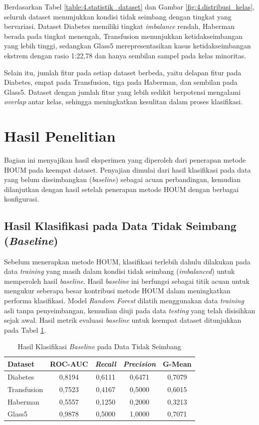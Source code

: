 Berdasarkan Tabel \ref{table:4.statistik_dataset} dan Gambar \ref{fig:4.distribusi_kelas}, seluruh dataset menunjukkan kondisi tidak seimbang dengan tingkat yang bervariasi. Dataset Diabetes memiliki tingkat \textit{imbalance} rendah, Haberman berada pada tingkat menengah, Transfusion menunjukkan ketidakseimbangan yang lebih tinggi, sedangkan Glass5 merepresentasikan kasus ketidakseimbangan ekstrem dengan rasio 1:22,78 dan hanya sembilan sampel pada kelas minoritas. \par

Selain itu, jumlah fitur pada setiap dataset berbeda, yaitu delapan fitur pada Diabetes, empat pada Transfusion, tiga pada Haberman, dan sembilan pada Glass5. Dataset dengan jumlah fitur yang lebih sedikit berpotensi mengalami \textit{overlap} antar kelas, sehingga meningkatkan kesulitan dalam proses klasifikasi.
\section{Hasil Penelitian} \label{IV.Hasil_penelitian}
Bagian ini menyajikan hasil eksperimen yang diperoleh dari penerapan metode HOUM pada keempat dataset. Penyajian dimulai dari hasil klasifikasi pada data yang belum diseimbangkan (\textit{baseline}) sebagai acuan perbandingan, kemudian dilanjutkan dengan hasil setelah penerapan metode HOUM dengan berbagai konfigurasi.

\subsection{Hasil Klasifikasi pada Data Tidak Seimbang (\textit{Baseline})} \label{IV.Baseline}
Sebelum menerapkan metode HOUM, klasifikasi terlebih dahulu dilakukan pada data \textit{training} yang masih dalam kondisi tidak seimbang (\textit{imbalanced}) untuk memperoleh hasil \textit{baseline}. Hasil \textit{baseline} ini berfungsi sebagai titik acuan untuk mengukur seberapa besar kontribusi metode HOUM dalam meningkatkan performa klasifikasi. Model \textit{Random Forest} dilatih menggunakan data \textit{training} asli tanpa penyeimbangan, kemudian diuji pada data \textit{testing} yang telah disisihkan sejak awal. Hasil metrik evaluasi \textit{baseline} untuk keempat dataset ditunjukkan pada Tabel \ref{table:4.baseline}. \par

\begin{table}[H]
\centering
\caption{Hasil Klasifikasi \textit{Baseline} pada Data Tidak Seimbang}
\label{table:4.baseline}
\begin{tabular}{|l|c|c|c|c|}
\hline
\textbf{Dataset} & \textbf{ROC-AUC} & \textbf{\textit{Recall}} & \textbf{\textit{Precision}} & \textbf{G-Mean} \\
\hline
Diabetes & 0,8194 & 0,6111 & 0,6471 & 0,7079 \\
\hline
Transfusion & 0,7523 & 0,4167 & 0,5000 & 0,6015 \\
\hline
Haberman & 0,5557 & 0,1250 & 0,2000 & 0,3213 \\
\hline
Glass5 & 0,9878 & 0,5000 & 1,0000 & 0,7071 \\
\hline
\end{tabular}
\end{table}

